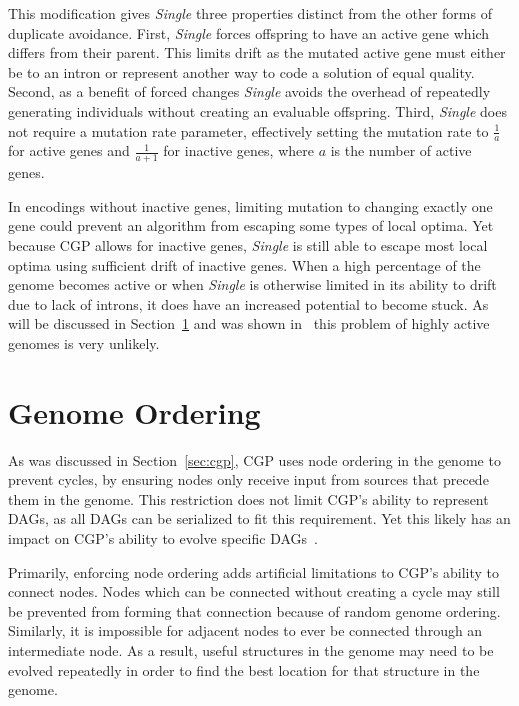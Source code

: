 \documentclass[journal]{IEEEtran}
\begin{document}
This modification gives \emph{Single} three properties distinct from the other
forms of duplicate avoidance.  First, \emph{Single} forces offspring to have
an active gene which differs from their parent.  This limits drift as the
mutated active gene must either be to an intron or represent another way to
code a solution of equal quality.  Second, as a benefit of forced changes
\emph{Single} avoids the overhead of repeatedly generating individuals without
creating an evaluable offspring.  Third, \emph{Single} does not require a mutation
rate parameter, effectively setting the mutation rate to $\frac{1}{a}$ for active
genes and $\frac{1}{a+1}$ for inactive genes, where $a$ is the number of active genes.

In encodings without inactive genes, limiting mutation to changing exactly one gene
could prevent an algorithm from escaping some types of local optima.  Yet because
CGP allows for inactive genes, \emph{Single} is still able to escape most local
optima using sufficient drift of inactive genes.  When a high percentage of
the genome becomes active or when \emph{Single} is otherwise limited in its ability
to drift due to lack of introns, it does have an increased potential to become stuck.
As will be discussed in Section~\ref{sec:ordering} and was shown in~\cite{goldman:2013:ordering}
this problem of highly active genomes is very unlikely.

\section{Genome Ordering}
\label{sec:ordering}
As was discussed in Section~\ref{sec:cgp}, CGP uses node ordering in the genome
to prevent cycles, by ensuring nodes only receive input from sources that
precede them in the genome.  This restriction does not limit CGP's ability
to represent DAGs, as all DAGs can be serialized to fit this requirement.
Yet this likely has an impact on CGP's ability to evolve specific
DAGs~\cite{goldman:2013:ordering}.

Primarily, enforcing node ordering adds artificial limitations to CGP's ability to
connect nodes.  Nodes which can be connected without creating a cycle may
still be prevented from forming that connection because of random genome ordering.
Similarly, it is impossible for adjacent nodes
to ever be connected through an intermediate node.  As a result, useful structures
in the genome may need to be evolved repeatedly in order to find the best
location for that structure in the genome.
\end{document}
